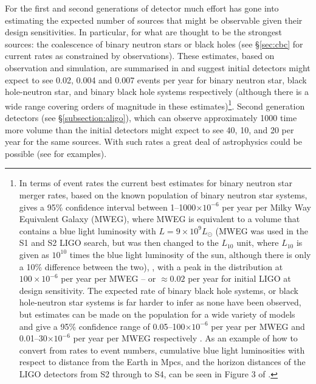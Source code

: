 \documentclass{article}
\begin{document}
For the first and second generations of detector much effort has gone into 
estimating the expected number of sources that might be observable given their
design sensitivities. In particular, for what are thought to be the strongest
sources: the coalescence of binary neutron stars or black holes (see
\S\ref{sec:cbc} for current rates as constrained by observations). These 
estimates, based on observation and simulation, are summarised in
\cite{Abadie:2010e} and suggest initial detectors might expect to see 0.02,
0.004 and 0.007 events per year for binary neutron star, black hole-neutron
star, and binary black hole systems respectively (although there is a wide range
covering orders of magnitude in these estimates)\footnote{In terms of event
rates the current best estimates for binary neutron star merger rates, based on
the known population of binary neutron star systems, gives a 95\% confidence
interval between 1--1000$\times10^{-6}$ per year per Milky Way Equivalent Galaxy
(MWEG), where MWEG is equivalent to a volume that contains a blue light
luminosity with $L = 9\times10^9L_{\odot}$ (MWEG was used in the S1 and S2 LIGO
search, but was then changed to the $L_{10}$ unit, where $L_{10}$ is given as
$10^{10}$ times the blue light luminosity of the sun, although there is only a
10\% difference between the two), \cite{Abadie:2010e, Kalogera:2004a,
Kalogera:2004b}, with a peak in the distribution at $100\times10^{-6}$ per year
per MWEG -- or $\approx 0.02$ per year for initial LIGO at design sensitivity.
The expected rate of binary black hole systems, or black hole-neutron star
systems is far harder to infer as none have been observed, but estimates can be
made on the population for a wide variety of models and give a 95\% confidence
range of 0.05--100$\times10^{-6}$ per year per MWEG and 0.01--30$\times10^{-6}$
per year per MWEG respectively \cite{Abadie:2010e, OShaughnessy:2005,
OShaughnessy:2008, Abbott:2008a}. As an example of how to convert from rates to
event numbers, cumulative blue light luminosities with respect to distance from
the Earth in Mpcs, and the horizon distances of the LIGO detectors from S2
through to S4, can be seen in Figure 3 of \cite{Abbott:2008a}.}. Second
generation detectors (see \S\ref{subsection:aligo}), which can observe
approximately 1000 time more volume than the initial detectors might expect to
see 40, 10, and 20 per year for the same sources. With such rates a great deal
of astrophysics could be possible (see \cite{Sathyaprakash:2009} for examples).
\end{document}
